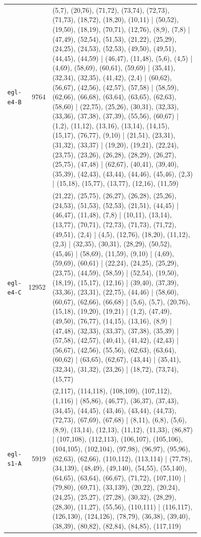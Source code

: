 \begin{landscape}
\begin{longtable}{lr>{\tiny\raggedright\arraybackslash}p{0.78\linewidth}}
\texttt{egl-e4-B} & 9764 & (5,7), (20,76), (71,72), (73,74), (72,73), (71,73), (18,72), (18,20), (10,11) | (50,52), (19,50), (18,19), (70,71), (12,76), (8,9), (7,8) | (47,49), (52,54), (51,53), (21,22), (25,29), (24,25), (24,53), (52,53), (49,50), (49,51), (44,45), (44,59) | (46,47), (11,48), (5,6), (4,5) | (4,69), (58,69), (60,61), (59,69) | (35,41), (32,34), (32,35), (41,42), (2,4) | (60,62), (56,67), (42,56), (42,57), (57,58) | (58,59), (62,66), (66,68), (63,64), (63,65), (62,63), (58,60) | (22,75), (25,26), (30,31), (32,33), (33,36), (37,38), (37,39), (55,56), (60,67) | (1,2), (11,12), (13,16), (13,14), (14,15), (15,17), (76,77), (9,10) | (21,51), (23,31), (31,32), (33,37) | (19,20), (19,21), (22,24), (23,75), (23,26), (26,28), (28,29), (26,27), (25,75), (47,48) | (62,67), (40,41), (39,40), (35,39), (42,43), (43,44), (44,46), (45,46), (2,3) | (15,18), (15,77), (13,77), (12,16), (11,59) \\[2pt]
\texttt{egl-e4-C} & 12952 & (21,22), (25,75), (26,27), (26,28), (25,26), (24,53), (51,53), (52,53), (21,51), (44,45) | (46,47), (11,48), (7,8) | (10,11), (13,14), (13,77), (70,71), (72,73), (71,73), (71,72), (49,51), (2,4) | (4,5), (12,76), (18,20), (11,12), (2,3) | (32,35), (30,31), (28,29), (50,52), (45,46) | (58,69), (11,59), (9,10) | (4,69), (59,69), (60,61) | (22,24), (24,25), (25,29), (23,75), (44,59), (58,59) | (52,54), (19,50), (18,19), (15,17), (12,16) | (39,40), (37,39), (33,36), (23,31), (22,75), (44,46) | (58,60), (60,67), (62,66), (66,68) | (5,6), (5,7), (20,76), (15,18), (19,20), (19,21) | (1,2), (47,49), (49,50), (76,77), (14,15), (13,16), (8,9) | (47,48), (32,33), (33,37), (37,38), (35,39) | (57,58), (42,57), (40,41), (41,42), (42,43) | (56,67), (42,56), (55,56), (62,63), (63,64), (60,62) | (63,65), (62,67), (43,44) | (35,41), (32,34), (31,32), (23,26) | (18,72), (73,74), (15,77) \\[2pt]
\texttt{egl-s1-A} & 5919 & (2,117), (114,118), (108,109), (107,112), (1,116) | (85,86), (46,77), (36,37), (37,43), (34,45), (44,45), (43,46), (43,44), (44,73), (72,73), (67,69), (67,68) | (8,11), (6,8), (5,6), (8,9), (13,14), (12,13), (11,12), (11,33), (86,87) | (107,108), (112,113), (106,107), (105,106), (104,105), (102,104), (97,98), (96,97), (95,96), (62,63), (62,66), (110,112), (113,114) | (77,78), (34,139), (48,49), (49,140), (54,55), (55,140), (64,65), (63,64), (66,67), (71,72), (107,110) | (79,80), (69,71), (33,139), (20,22), (20,24), (24,25), (25,27), (27,28), (30,32), (28,29), (28,30), (11,27), (55,56), (110,111) | (116,117), (126,130), (124,126), (78,79), (36,38), (39,40), (38,39), (80,82), (82,84), (84,85), (117,119) \\[2pt]

\end{longtable}
\end{landscape}
